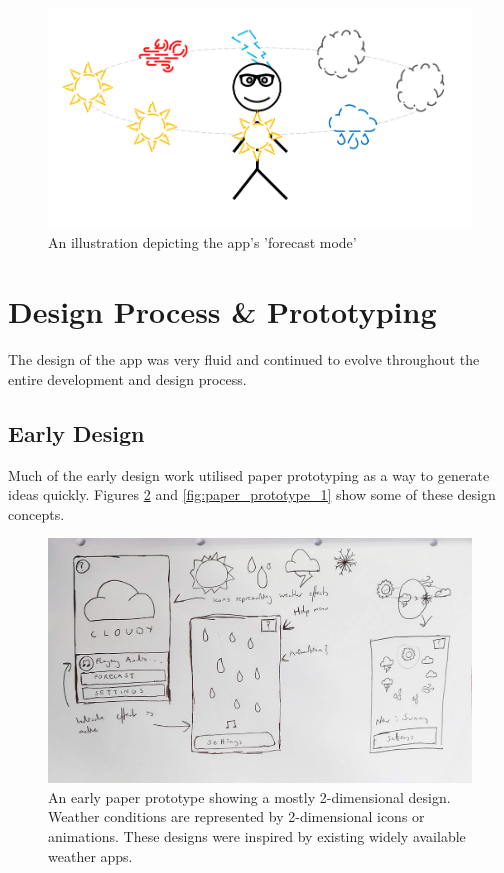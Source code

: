 \documentclass{l4proj}
\begin{document}
\begin{figure}[htb!]
    \centering
    \includegraphics[width=0.9\linewidth]{images/forecast_illustration.png}
    \caption{An illustration depicting the app's 'forecast mode'}
    \label{fig:forecast_illustration}
\end{figure}

\section{Design Process \& Prototyping}

The design of the app was very fluid and continued to evolve throughout the entire development and design process.
\subsection{Early Design}

Much of the early design work utilised paper prototyping as a way to generate ideas quickly. Figures \ref{fig:early_paper_prototype} and \ref{fig:paper_prototype_1} show some of these design concepts.

\begin{figure}[htb!]
    \centering
    \includegraphics[width=0.9\linewidth]{images/early_paper.jpg}
    \caption{An early paper prototype showing a mostly 2-dimensional design. Weather conditions are represented by 2-dimensional icons or animations. These designs were inspired by existing widely available weather apps.}
    \label{fig:early_paper_prototype}
\end{figure}
\end{document}
